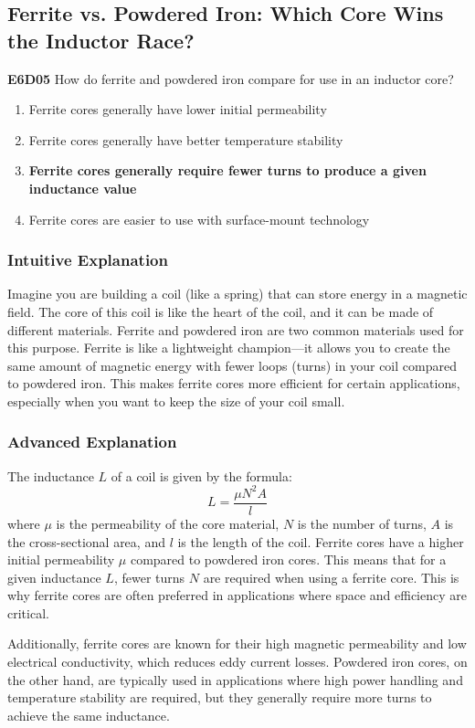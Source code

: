 \subsection{Ferrite vs. Powdered Iron: Which Core Wins the Inductor Race?}

\begin{tcolorbox}[colback=gray!10!white,colframe=black!75!black,title=Multiple Choice Question]
\textbf{E6D05} How do ferrite and powdered iron compare for use in an inductor core?
\begin{enumerate}[label=\Alph*.]
    \item Ferrite cores generally have lower initial permeability
    \item Ferrite cores generally have better temperature stability
    \item \textbf{Ferrite cores generally require fewer turns to produce a given inductance value}
    \item Ferrite cores are easier to use with surface-mount technology
\end{enumerate}
\end{tcolorbox}

\subsubsection{Intuitive Explanation}
Imagine you are building a coil (like a spring) that can store energy in a magnetic field. The core of this coil is like the heart of the coil, and it can be made of different materials. Ferrite and powdered iron are two common materials used for this purpose. Ferrite is like a lightweight champion—it allows you to create the same amount of magnetic energy with fewer loops (turns) in your coil compared to powdered iron. This makes ferrite cores more efficient for certain applications, especially when you want to keep the size of your coil small.

\subsubsection{Advanced Explanation}
The inductance \( L \) of a coil is given by the formula:
\[
L = \frac{\mu N^2 A}{l}
\]
where \( \mu \) is the permeability of the core material, \( N \) is the number of turns, \( A \) is the cross-sectional area, and \( l \) is the length of the coil. Ferrite cores have a higher initial permeability \( \mu \) compared to powdered iron cores. This means that for a given inductance \( L \), fewer turns \( N \) are required when using a ferrite core. This is why ferrite cores are often preferred in applications where space and efficiency are critical.

Additionally, ferrite cores are known for their high magnetic permeability and low electrical conductivity, which reduces eddy current losses. Powdered iron cores, on the other hand, are typically used in applications where high power handling and temperature stability are required, but they generally require more turns to achieve the same inductance.

